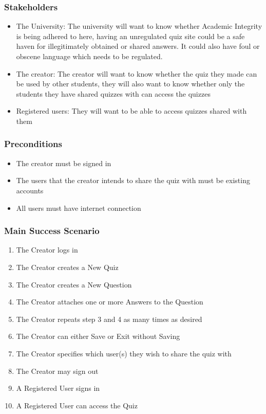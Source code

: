 \documentclass[a4paper]{article}
\begin{document}
	\subsubsection{Stakeholders}
	\begin{itemize}
		\item The University: The university will want to know whether Academic Integrity is being adhered to here,
having an unregulated quiz site could be a safe haven for illegitimately obtained or shared
answers. It could also have foul or obscene language which needs to be regulated.
		\item  The creator: The creator will want to know whether the quiz they made can be used by other students,
they will also want to know whether only the students they have shared quizzes with can
access the quizzes
		\item Registered users: They will want to be able to access quizzes shared with them
	\end{itemize}
	\subsubsection{Preconditions}
	\begin{itemize}
		\item The creator must be signed in
		\item The users that the creator intends to share the quiz with must be existing accounts
		\item All users must have internet connection
	\end{itemize}
	\subsubsection{Main Success Scenario}
	\begin{enumerate}
		\item The Creator logs in
		\item The Creator creates a New Quiz
		\item The Creator creates a New Question
		\item The Creator attaches one or more Answers to the Question
		\item The Creator repeats step 3 and 4 as many times as desired
		\item The Creator can either Save or Exit without Saving
		\item The Creator specifies which user(s) they wish to share the quiz with
		\item The Creator may sign out
		\item A Registered User signs in
		\item A Registered User can access the Quiz
	\end{enumerate}
\end{document}
